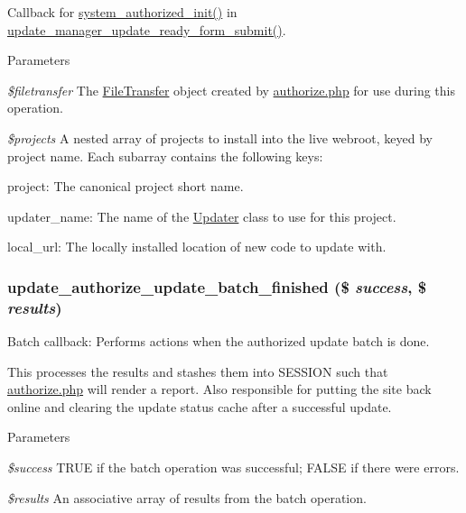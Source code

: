 Callback for \hyperlink{group__authorize_ga17756b29805705dbea25798d6004d5dd}{system\_\-authorized\_\-init()} in \hyperlink{group__update__manager__update_gaeab4690bf95cb0d0b517a0b9161e5045}{update\_\-manager\_\-update\_\-ready\_\-form\_\-submit()}.


\begin{DoxyParams}{Parameters}
\item[{\em \$filetransfer}]The \hyperlink{classFileTransfer}{FileTransfer} object created by \hyperlink{authorize_8php}{authorize.php} for use during this operation. \item[{\em \$projects}]A nested array of projects to install into the live webroot, keyed by project name. Each subarray contains the following keys:
\begin{DoxyItemize}
\item project: The canonical project short name.
\item updater\_\-name: The name of the \hyperlink{classUpdater}{Updater} class to use for this project.
\item local\_\-url: The locally installed location of new code to update with. 
\end{DoxyItemize}\end{DoxyParams}
\hypertarget{update_8authorize_8inc_af57a6cf83861d59b3aa904b3d68c1f73}{
\subsubsection[{update\_\-authorize\_\-update\_\-batch\_\-finished}]{\setlength{\rightskip}{0pt plus 5cm}update\_\-authorize\_\-update\_\-batch\_\-finished (\$ {\em success}, \/  \$ {\em results})}}
\label{update_8authorize_8inc_af57a6cf83861d59b3aa904b3d68c1f73}
Batch callback: Performs actions when the authorized update batch is done.

This processes the results and stashes them into SESSION such that \hyperlink{authorize_8php}{authorize.php} will render a report. Also responsible for putting the site back online and clearing the update status cache after a successful update.


\begin{DoxyParams}{Parameters}
\item[{\em \$success}]TRUE if the batch operation was successful; FALSE if there were errors. \item[{\em \$results}]An associative array of results from the batch operation. \end{DoxyParams}
